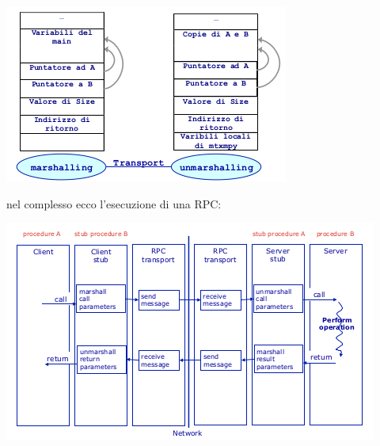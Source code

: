\documentclass[a4paper,12pt, oneside]{book}
\begin{document}
\begin{center}
\includegraphics[scale=0.7]{img/stub3.png}
\end{center}
nel complesso ecco l'esecuzione di una RPC:
\begin{center}
\includegraphics[scale=0.7]{img/rpct.png}
\end{center}
\end{document}
